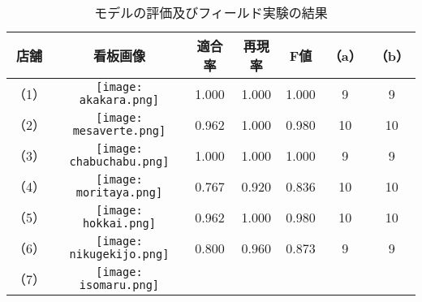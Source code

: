   \begin{table}[t]
    \caption{モデルの評価及びフィールド実験の結果}
    \label{table:recog_result}
    \begin{center}
      \begin{tabular}{cc|ccc|cc}
        \hline\hline
        \textbf{店舗} & \textbf{看板画像} & \textbf{適合率} & \textbf{再現率} & \textbf{F値} & \textbf{（a）} & \textbf{（b）} \\ \hline
        （1） & 
        \begin{minipage}{40mm}
          \centering
          \texttt{[image: akakara.png]}
        \end{minipage} & 
        1.000 & 1.000 & 1.000 & %
        9 & 9 \\
        （2） & 
        \begin{minipage}{40mm}
          \centering
          \texttt{[image: mesaverte.png]}
        \end{minipage} &
        0.962 & 1.000 & 0.980 & %
        10 & 10 \\
        （3） & 
        \begin{minipage}{40mm}
          \centering
          \texttt{[image: chabuchabu.png]}
        \end{minipage} &
        1.000 & 1.000 & 1.000 & %
        9 & 9 \\
        （4） & 
        \begin{minipage}{40mm}
          \centering
          \texttt{[image: moritaya.png]}
        \end{minipage} & 
        0.767 & 0.920 & 0.836 & %
        10 & 10 \\
        （5） & 
        \begin{minipage}{40mm}
          \centering
          \texttt{[image: hokkai.png]}
        \end{minipage} & 
        0.962 & 1.000 & 0.980 & %
        10 & 10 \\
        （6） & 
        \begin{minipage}{40mm}
          \centering
          \texttt{[image: nikugekijo.png]}
        \end{minipage} &
        0.800 & 0.960 & 0.873 & %
        9 & 9 \\
        （7） & 
        \begin{minipage}{40mm}
          \centering
          \texttt{[image: isomaru.png]}

\end{minipage}
\end{tabular}
\end{center}
\end{table}
